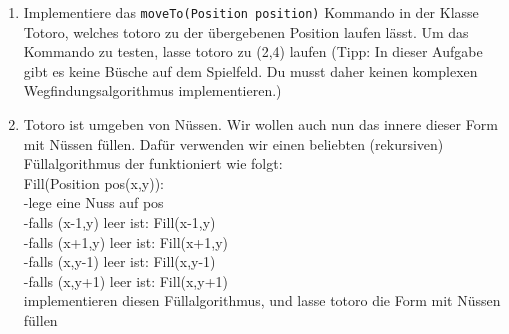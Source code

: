 
\begin{enumerate}
\item Implementiere das \lstinline{moveTo(Position position)} Kommando in der Klasse Totoro, welches totoro zu der übergebenen Position laufen lässt. Um das Kommando zu testen, lasse totoro zu (2,4) laufen (Tipp: In dieser Aufgabe gibt es keine Büsche auf dem Spielfeld. Du musst daher keinen komplexen Wegfindungsalgorithmus implementieren.)
\item Totoro ist umgeben von Nüssen. Wir wollen auch nun das innere dieser Form mit Nüssen füllen. Dafür verwenden wir einen beliebten (rekursiven) Füllalgorithmus der funktioniert wie folgt:\\
Fill(Position pos(x,y)):\\
-lege eine Nuss auf pos\\
-falls (x-1,y) leer ist: Fill(x-1,y)\\
-falls (x+1,y) leer ist: Fill(x+1,y)\\
-falls (x,y-1) leer ist: Fill(x,y-1)\\
-falls (x,y+1) leer ist: Fill(x,y+1)\\

implementieren diesen Füllalgorithmus, und lasse totoro die Form mit Nüssen füllen
\end{enumerate}
